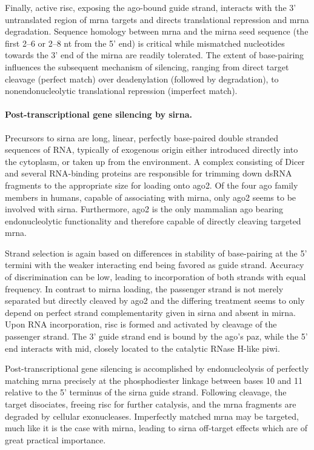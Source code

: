 Finally, active \gls{risc}, exposing the \glsdesc{ago}-bound guide strand, interacts with the 3' untranslated region of \gls{mrna} targets and directs translational repression and \gls{mrna} degradation. Sequence homology between \gls{mrna} and the \gls{mirna} seed sequence (the first 2--6 or 2--8 nt from the 5' end) is critical while mismatched nucleotides towards the 3' end of the \gls{mirna} are readily tolerated. The extent of base-pairing influences the subsequent mechanism of silencing, ranging from direct target cleavage (perfect match) over deadenylation (followed by degradation), to nonendonucleolytic translational repression (imperfect match).

\paragraph{Post-transcriptional gene silencing by \gls{sirna}.}
Precursors to \gls{sirna} are long, linear, perfectly base-paired double stranded sequences of RNA, typically of exogenous origin either introduced directly into the cytoplasm, or taken up from the environment. A complex consisting of Dicer and several RNA-binding proteins are responsible for trimming down dsRNA fragments to the appropriate size for loading onto \gls{ago}2. Of the four \glsdesc{ago} family members in humans, capable of associating with \gls{mirna}, only \gls{ago}2 seems to be involved with \gls{sirna}. Furthermore, \gls{ago}2 is the only mammalian \glsdesc{ago} bearing endonucleolytic functionality and therefore capable of directly cleaving targeted \gls{mrna}.

Strand selection is again based on differences in stability of base-pairing at the 5' termini with the weaker interacting end being favored as guide strand. Accuracy of discrimination can be low, leading to incorporation of both strands with equal frequency. In contrast to \gls{mirna} loading, the passenger strand is not merely separated but directly cleaved by \gls{ago}2 and the differing treatment seems to only depend on perfect strand complementarity given in \gls{sirna} and absent in \gls{mirna}. Upon RNA incorporation, \gls{risc} is formed and activated by cleavage of the passenger strand. The 3' guide strand end is bound by the \glsdesc{ago}'s \gls{paz}, while the 5' end interacts with \gls{mid}, closely located to the catalytic RNase H-like \gls{piwi}.

Post-transcriptional gene silencing is accomplished by endonucleolysis of perfectly matching \gls{mrna} precisely at the phosphodiester linkage between bases 10 and 11 relative to the 5' terminus of the \gls{sirna} guide strand. Following cleavage, the target disociates, freeing \gls{risc} for further catalysis, and the \gls{mrna} fragments are degraded by cellular exonucleases. Imperfectly matched \gls{mrna} may be targeted, much like it is the case with \gls{mirna}, leading to \gls{sirna} off-target effects which are of great practical importance.

